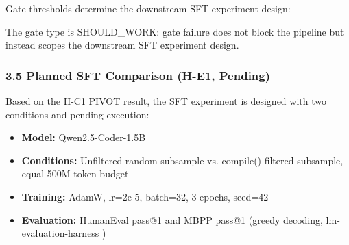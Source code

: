 Gate thresholds determine the downstream SFT experiment design:

\begin{table}[htbp]
\centering
{}
\end{table}

The gate type is SHOULD\_WORK: gate failure does not block the pipeline but instead scopes
the downstream SFT experiment design.

\subsubsection{3.5 Planned SFT Comparison (H-E1, Pending)}

Based on the H-C1 PIVOT result, the SFT experiment is designed with two conditions and
pending execution:

\begin{itemize}
\item \textbf{Model:} Qwen2.5-Coder-1.5B \citep{Hui2024}
\item \textbf{Conditions:} Unfiltered random subsample vs. compile()-filtered subsample, equal 500M-token budget
\item \textbf{Training:} AdamW, lr=2e-5, batch=32, 3 epochs, seed=42
\item \textbf{Evaluation:} HumanEval pass@1 and MBPP pass@1 (greedy decoding, lm-evaluation-harness \citep{EvalHarness2021})
\end{itemize}


